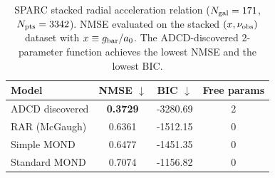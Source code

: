 \begin{table}[H]
\centering\footnotesize
\caption{SPARC stacked radial acceleration relation ($N_{\rm gal}=171$, $N_{\rm pts}=3342$).
NMSE evaluated on the stacked $(x, \nu_{\rm obs})$ dataset with
$x \equiv g_{\rm bar}/a_0$. The ADCD-discovered 2-parameter function achieves the
lowest NMSE and the lowest BIC.}
\label{tab:sparc_comparison}
\begin{tabular}{l c c c}
\toprule
\textbf{Model} & \textbf{NMSE} $\downarrow$ & \textbf{BIC} $\downarrow$ & \textbf{Free params} \\
\midrule
  ADCD discovered & \textbf{0.3729} & -3280.69 & 2 \\
  RAR (McGaugh) & 0.6361 & -1512.15 & 0 \\
  Simple MOND & 0.6477 & -1451.35 & 0 \\
  Standard MOND & 0.7074 & -1156.82 & 0 \\
\bottomrule
\end{tabular}
\end{table}
